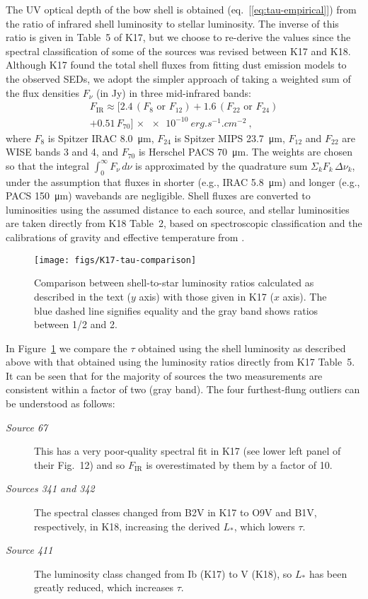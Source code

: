 \documentclass[useAMS, usenatbib, a4paper]{mnras}
\begin{document}
The UV optical depth of the bow shell is obtained
(eq.~[\ref{eq:tau-empirical}]) from the ratio of infrared shell
luminosity to stellar luminosity.  The inverse of this ratio is given
in Table~5 of K17, but we choose to re-derive the values since the
spectral classification of some of the sources was revised between K17
and K18.  Although K17 found the total shell fluxes from fitting dust
emission models to the observed SEDs, we adopt the simpler approach of
taking a weighted sum of the flux densities \(F_\nu\) (in \si{Jy}) in
three mid-infrared bands:
\begin{multline}
  \label{eq:total-ir-flux}
  F_{\text{IR}}  \approx \bigl[  2.4\,(F_8 \text{ or } F_{12})
    + 1.6\,(F_{22} \text{ or } F_{24})  \\
  + 0.51\,F_{70}\bigr]
  \,\times \SI{e-10}{erg.s^{-1}.cm^{-2}} \ ,
\end{multline}
where \(F_8\) is Spitzer IRAC \SI{8.0}{\um}, \(F_{24}\) is Spitzer
MIPS \SI{23.7}{\um}, \(F_{12}\) and \(F_{22}\) are WISE bands 3 and 4,
and \(F_{70}\) is Herschel PACS \SI{70}{\um}.  The weights are chosen
so that the integral \(\int_0^\infty F_\nu \,d\nu\) is approximated by the
quadrature sum \(\Sigma_k F_k\, \Delta\nu_k\), under the assumption that fluxes in
shorter (e.g., IRAC \SI{5.8}{\um}) and longer (e.g., PACS
\SI{150}{\um}) wavebands are negligible.  Shell fluxes are converted
to luminosities using the assumed distance to each source, and stellar
luminosities are taken directly from K18 Table~2, based on
spectroscopic classification and the calibrations of gravity and
effective temperature from \citet{Martins:2005a}.

\begin{figure}
  \centering
  \texttt{[image: figs/K17-tau-comparison]}
  \caption{Comparison between shell-to-star luminosity ratios
    calculated as described in the text (\(y\) axis) with those given
    in K17 (\(x\) axis).  The blue dashed line signifies equality and
    the gray band shows ratios between 1/2 and 2.}
  \label{fig:k17-k18-comparison}
\end{figure}

In Figure~\ref{fig:k17-k18-comparison} we compare the \(\tau\) obtained
using the shell luminosity as described above with that obtained using
the luminosity ratios directly from K17 Table~5.  It can be seen that
for the majority of sources the two measurements are consistent within
a factor of two (gray band).  The four furthest-flung outliers can be
understood as follows:
\begin{description}
\item[\textit{Source 67}] This has a very poor-quality spectral fit in
  K17 (see lower left panel of their Fig.~12) and so 
  \(F_{\text{IR}}\) is overestimated by them by a factor of 10.
\item[\textit{Sources 341 and 342}] The spectral classes changed from
  B2V in K17 to O9V and B1V, respectively, in K18, increasing the
  derived \(L_*\), which lowers \(\tau\).
\item[\textit{Source 411}] The luminosity class changed from Ib (K17)
  to V (K18), so \(L_*\) has been greatly reduced, which increases
  \(\tau\).
\end{description}
\end{document}
